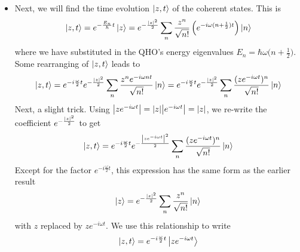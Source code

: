 \documentclass[11pt, a4paper]{article}
\begin{document}
\begin{itemize}
	\item Next, we will find the time evolution $ \ket{z, t} $ of the coherent states. This is
	\begin{equation*}
		\ket{z, t} = e^{-\frac{E_{n}}{\hbar}t} \ket{z} = e^{-\frac{\abs{z}^{2}}{2}} \sum_{n}\frac{z^{n}}{\sqrt{n!}} \left(e^{-i\omega (n + \frac{1}{2})t}\right) \ket{n} 
	\end{equation*}
	where we have substituted in the QHO's energy eigenvalues $ E_{n} = \hbar\omega \big(n + \frac{1}{2}\big) $. Some rearranging of $ \ket{z, t} $ leads to
	\begin{equation*}
		\ket{z, t} = e^{-i\frac{\omega}{2}t}e^{-\frac{\abs{z}^{2}}{2}}\sum_{n}\frac{z^{n}e^{-i\omega n t}}{\sqrt{n!}}\ket{n} = e^{-i\frac{\omega}{2}t}e^{-\frac{\abs{z}^{2}}{2}} \sum_{n} \frac{(ze^{-i\omega t})^{n}}{\sqrt{n!}} \ket{n}
	\end{equation*}
	Next, a slight trick. Using $ \abs{ze^{-i\omega t}} = \abs{z}\abs{e^{-i\omega t}} = \abs{z}$, we re-write the coefficient $ e^{-\frac{\abs{z}^{2}}{2}} $ to get
	\begin{equation*}
		\ket{z, t} =  e^{-i\frac{\omega}{2}t}e^{-\frac{\abs{ze^{-i\omega t}}^{2}}{2}} \sum_{n} \frac{(ze^{-i\omega t})^{n}}{\sqrt{n!}} \ket{n}
	\end{equation*}
	Except for the factor $ e^{-i\frac{\omega}{2}t} $, this expression has the same form as the earlier result
	\begin{equation*}
		\ket{z} = e^{-\frac{\abs{z}^{2}}{2}} \sum_{n}\frac{z^{n}}{\sqrt{n!}} \ket{n}
	\end{equation*}
	with $ z $ replaced by $ z e^{-i\omega t} $. We use this relationship to write
	\begin{equation*}
		\ket{z, t} = e^{-i \frac{\omega}{2}t} \ket{z e^{-i\omega t}}
	\end{equation*}
	

\end{itemize}
\end{document}
